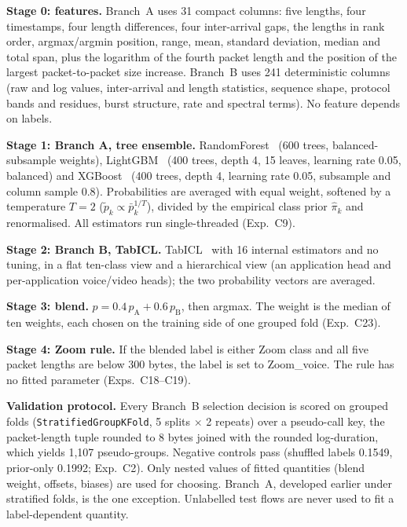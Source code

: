 \noindent\textbf{Stage 0: features.} Branch~A uses 31 compact columns: five lengths, four
timestamps, four length differences, four inter-arrival gaps, the lengths in rank
order, argmax/argmin position, range, mean, standard deviation, median and total span,
plus the logarithm of the fourth packet length and the position of the largest
packet-to-packet size increase. Branch~B uses 241 deterministic columns (raw and log
values, inter-arrival and length statistics, sequence shape, protocol bands and
residues, burst structure, rate and spectral terms). No feature depends on labels.

\noindent\textbf{Stage 1: Branch A, tree ensemble.} RandomForest~\cite{breiman2001rf} (600 trees,
balanced-subsample weights), LightGBM~\cite{ke2017lightgbm} (400 trees, depth 4, 15
leaves, learning rate 0.05, balanced) and XGBoost~\cite{chen2016xgboost} (400 trees,
depth 4, learning rate 0.05, subsample and column sample 0.8). Probabilities are
averaged with equal weight, softened by a temperature $T=2$
($\tilde p_k\propto\bar p_k^{1/T}$), divided by the empirical class prior
$\hat\pi_k$ and renormalised. All estimators run single-threaded (Exp.~C9).

\noindent\textbf{Stage 2: Branch B, TabICL.} TabICL~\cite{qu2025tabicl} with 16 internal
estimators and no tuning, in a flat ten-class view and a hierarchical view (an
application head and per-application voice/video heads); the two probability vectors
are averaged.

\noindent\textbf{Stage 3: blend.} $p=0.4\,p_{\mathrm{A}}+0.6\,p_{\mathrm{B}}$, then argmax. The
weight is the median of ten weights, each chosen on the training side of one grouped
fold (Exp.~C23).

\noindent\textbf{Stage 4: Zoom rule.} If the blended label is either Zoom class and all five
packet lengths are below 300 bytes, the label is set to Zoom\_voice. The rule has no
fitted parameter (Exps.~C18--C19).

\noindent\textbf{Validation protocol.} Every Branch~B selection decision is scored on
grouped folds (\texttt{StratifiedGroupKFold}, 5 splits $\times$ 2 repeats) over a
pseudo-call key, the packet-length tuple rounded to 8 bytes joined with the rounded
log-duration, which yields 1{,}107 pseudo-groups. Negative controls pass (shuffled
labels 0.1549, prior-only 0.1992; Exp.~C2). Only nested values of fitted quantities (blend
weight, offsets, biases) are used for choosing. Branch~A, developed earlier under
stratified folds, is the one exception. Unlabelled test flows are never used to fit a
label-dependent quantity.

